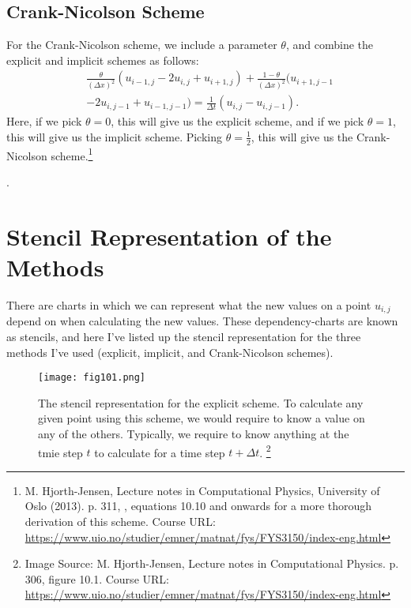 \documentclass[reprint,english,notitlepage]{revtex4-1}  %
\begin{document}
\begin{appendix}
\subsection{Crank-Nicolson Scheme}

For the Crank-Nicolson scheme, we include a parameter $\theta$, and combine the explicit and implicit schemes as follows:
\begin{equation}
    \begin{split}
    &\frac{\theta}{(\Delta x)^2}(u_{i-1,j}-2u_{i,j}+u_{i+1,j}) + \frac{1-\theta}{(\Delta x)^2}(u_{i+1,j-1}\\ &- 2u_{i,j-1} + u_{i-1,j-1}) = \frac{1}{\Delta t}(u_{i,j}-u_{i,j-1}).
    \end{split}
\end{equation}
Here, if we pick $\theta = 0$, this will give us the explicit scheme, and if we pick $\theta = 1$, this will give us the implicit scheme. Picking $\theta = \frac{1}{2}$, this will give us the Crank-Nicolson scheme.\footnote{M. Hjorth-Jensen, Lecture notes in Computational Physics, University of Oslo (2013). p. 311, , equations 10.10 and onwards for a more thorough derivation of this scheme. Course URL: \url{https://www.uio.no/studier/emner/matnat/fys/FYS3150/index-eng.html}}

\newpage
.
\newpage

\section{Stencil Representation of the Methods}

There are charts in which we can represent what the new values on a point $u_{i,j}$ depend on when calculating the new values. These dependency-charts are known as stencils, and here I've listed up the stencil representation for the three methods I've used (explicit, implicit, and Crank-Nicolson schemes).
\begin{figure}[h!]
    \centering
    \texttt{[image: fig101.png]}
    \caption{The stencil representation for the explicit scheme. To calculate any given point using this scheme, we would require to know a value on any of the others. Typically, we require to know anything at the tmie step $t$ to calculate for a time step $t + \Delta t$. \footnote{Image Source: M. Hjorth-Jensen, Lecture notes in Computational Physics. p. 306, figure 10.1. Course URL: \url{https://www.uio.no/studier/emner/matnat/fys/FYS3150/index-eng.html}}}
    \label{fig:explicitstencil}
\end{figure}


\end{appendix}
\end{document}
